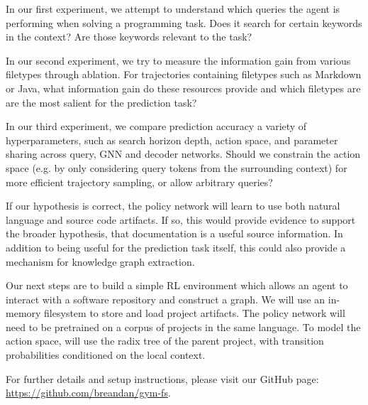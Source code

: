 \documentclass[11pt]{article}
\begin{document}
In our first experiment, we attempt to understand which queries the agent is performing when solving a programming task. Does it search for certain keywords in the context? Are those keywords relevant to the task?

In our second experiment, we try to measure the information gain from various filetypes through ablation. For trajectories containing filetypes such as Markdown or Java, what information gain do these resources provide and which filetypes are are the most salient for the prediction task?

In our third experiment, we compare prediction accuracy a variety of hyperparameters, such as search horizon depth, action space, and parameter sharing across query, GNN and decoder networks. Should we constrain the action space (e.g. by only considering query tokens from the surrounding context) for more efficient trajectory sampling, or allow arbitrary queries?

If our hypothesis is correct, the policy network will learn to use both natural language and source code artifacts. If so, this would provide evidence to support the broader hypothesis, that documentation is a useful source information. In addition to being useful for the prediction task itself, this could also provide a mechanism for knowledge graph extraction.

Our next steps are to build a simple RL environment which allows an agent to interact with a software repository and construct a graph. We will use an in-memory filesystem to store and load project artifacts. The policy network will need to be pretrained on a corpus of projects in the same language. To model the action space, will use the radix tree of the parent project, with transition probabilities conditioned on the local context.

For further details and setup instructions, please visit our GitHub page: \url{https://github.com/breandan/gym-fs}.

  
  
\end{document}
